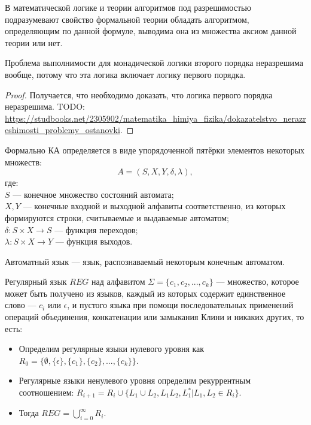     \begin{Def}
        В математической логике и теории алгоритмов под разрешимостью подразумевают свойство формальной теории обладать алгоритмом, определяющим по данной формуле, выводима она из множества аксиом данной теории или нет.
    \end{Def}
    \begin{Thm}
        Проблема выполнимости для монадической логики второго порядка неразрешима вообще, потому что эта логика включает логику первого порядка.
    \end{Thm}
    \begin{proof}
        Получается, что необходимо доказать, что логика первого порядка неразрешима. TODO: \url{https://studbooks.net/2305902/matematika_himiya_fizika/dokazatelstvo_nerazreshimosti_problemy_ostanovki}.
    \end{proof}
    \begin{Def}
        Формально КА определяется в виде упорядоченной пятёрки элементов некоторых множеств:
        $$ A=(S,X,Y,\delta ,\lambda ),$$
        где:\\
        $S$ --- конечное множество состояний автомата;\\
        $X, Y$ --- конечные входной и выходной алфавиты соответственно, из которых формируются строки, считываемые и выдаваемые автоматом;\\
        $\delta :S\times X\rightarrow S$ --- функция переходов;\\
        $\lambda :S\times X\rightarrow Y$ --- функция выходов.
    \end{Def}
    \begin{Def}
        Автоматный язык --- язык, распознаваемый некоторым конечным автоматом.
    \end{Def}
    \begin{Def}
        Регулярный язык $REG$ над алфавитом $\Sigma = \{c_1, c_2, ...,c_k\}$ — множество, которое может быть получено из языков, каждый из которых содержит единственное слово --- $c_i$ или $\epsilon$, и пустого языка при помощи последовательных применений операций объединения, конкатенации или замыкания Клини и никаких других, то есть:
        \begin{itemize}
            \item Определим регулярные языки нулевого уровня как $R_0 = \{\emptyset, \{\epsilon\}, \{c_1\}, \{c_2\}, ...,\{c_k\}\}$.
            \item Регулярные языки ненулевого уровня определим рекуррентным соотношением: $R_{i + 1} = R_i \cup \{L_1 \cup L_2, L_1L_2, L^*_1 | L_1, L_2 \in R_i\}$.
            \item Тогда $REG = \bigcup_{i = 0}^{\infty} R_i$.
        \end{itemize}   
    \end{Def}
